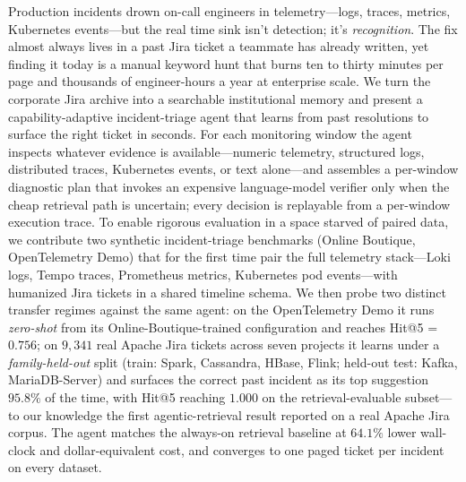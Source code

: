 
Production incidents drown on-call engineers in telemetry---logs, traces, metrics, Kubernetes events---but the real time sink isn't detection; it's \emph{recognition}. The fix almost always lives in a past Jira ticket a teammate has already written, yet finding it today is a manual keyword hunt that burns ten to thirty minutes per page and thousands of engineer-hours a year at enterprise scale. We turn the corporate Jira archive into a searchable institutional memory and present a capability-adaptive incident-triage agent that learns from past resolutions to surface the right ticket in seconds. For each monitoring window the agent inspects whatever evidence is available---numeric telemetry, structured logs, distributed traces, Kubernetes events, or text alone---and assembles a per-window diagnostic plan that invokes an expensive language-model verifier only when the cheap retrieval path is uncertain; every decision is replayable from a per-window execution trace. To enable rigorous evaluation in a space starved of paired data, we contribute two synthetic incident-triage benchmarks (Online Boutique, OpenTelemetry Demo) that for the first time pair the full telemetry stack---Loki logs, Tempo traces, Prometheus metrics, Kubernetes pod events---with humanized Jira tickets in a shared timeline schema. We then probe two distinct transfer regimes against the same agent: on the OpenTelemetry Demo it runs \emph{zero-shot} from its Online-Boutique-trained configuration and reaches Hit@5 = $0.756$; on $9{,}341$ real Apache Jira tickets across seven projects it learns under a \emph{family-held-out} split (train: Spark, Cassandra, HBase, Flink; held-out test: Kafka, MariaDB-Server) and surfaces the correct past incident as its top suggestion $95.8\%$ of the time, with Hit@5 reaching $1.000$ on the retrieval-evaluable subset---to our knowledge the first agentic-retrieval result reported on a real Apache Jira corpus. The agent matches the always-on retrieval baseline at $64.1\%$ lower wall-clock and dollar-equivalent cost, and converges to one paged ticket per incident on every dataset.
